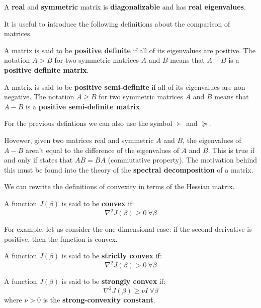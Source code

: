 \begin{theorem}
    A \textbf{real} and \textbf{symmetric} matrix is \textbf{diagonalizable} and has \textbf{real eigenvalues}.
\end{theorem}

It is useful to introduce the following definitions about the comparison of matrices.

\begin{definition}
    A matrix is said to be \textbf{positive definite} if all of its eigenvalues are positive. The notation $A > B$ for two symmetric matrices $A$ and $B$ means that $A-B$ is a \textbf{positive definite matrix}.
\end{definition}

\begin{definition}
    A matrix is said to be \textbf{positive semi-definite} if all of its eigenvalues are non-negative. The notation $A \geq B$ for two symmetric matrices $A$ and $B$ means that $A-B$ is a \textbf{positive semi-definite matrix}.
\end{definition}
For the previous defintions we can also use the symbol $\succ$ and $\succeq$.

Hovewer, given two matrices real and symmetric $A$ and $B$, the eigenvalues of $A-B$ aren't equal to the difference of the eigenvalues of $A$ and $B$. This is true if and only if states that $AB=BA$ (commutative property). The motivation behind this must be found into the theory of the \textbf{spectral decomposition} of a matrix.

We can rewrite the definitions of convexity in terms of the Hessian matrix.
\begin{definition}
    A function $J(\beta)$ is said to be \textbf{convex} if:
    \[
        \nabla^2 J(\beta) \geq 0 \ \forall \beta
    \]
\end{definition}

For example, let us consider the one dimensional case: if the second derivative is positive, then the function is convex.

\begin{definition}
    A function $J(\beta)$ is said to be \textbf{strictly convex} if:
    \[
        \nabla^2 J(\beta) > 0 \ \forall \beta
    \]
\end{definition}

\begin{definition}
    A function $J(\beta)$ is said to be \textbf{strongly convex} if:
    \[
        \nabla^2 J(\beta) \geq \nu I \ \forall \beta
    \]
    where $\nu > 0$ is the \textbf{strong-convexity constant}.
\end{definition}

